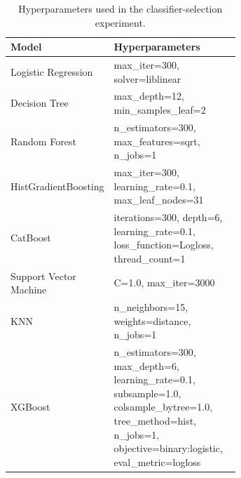 \documentclass{article}
\begin{document}
\begin{table}[t]
  \centering
  \footnotesize
  \caption{Hyperparameters used in the classifier-selection experiment.}
  \label{tab:classifier-hyperparameters}
  \begin{tabular}{@{}lp{0.65\linewidth}@{}}
    \toprule
    Model & Hyperparameters \\
    \midrule
    Logistic Regression &
      max\_iter=300, solver=liblinear \\
    \addlinespace
    Decision Tree &
    max\_depth=12, min\_samples\_leaf=2 \\
    \addlinespace
    Random Forest &
    n\_estimators=300, max\_features=sqrt, n\_jobs=1 \\
    \addlinespace
    HistGradientBoosting &
    max\_iter=300, learning\_rate=0.1, max\_leaf\_nodes=31 \\
    \addlinespace
    CatBoost &
    iterations=300, depth=6, learning\_rate=0.1,
    loss\_function=Logloss, thread\_count=1 \\
    \addlinespace
    Support Vector Machine &
    C=1.0, max\_iter=3000 \\
    \addlinespace
    KNN &
    n\_neighbors=15, weights=distance, n\_jobs=1 \\
    \addlinespace
    XGBoost &
      n\_estimators=300, max\_depth=6, learning\_rate=0.1,
      subsample=1.0, colsample\_bytree=1.0, tree\_method=hist,
      n\_jobs=1, objective=binary:logistic, eval\_metric=logloss \\
    \bottomrule
  \end{tabular}
\end{table}
\end{document}
